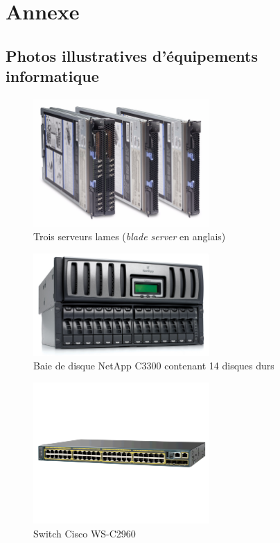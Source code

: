 \part{Annexe}

\chapter{Photos illustratives d'équipements informatique}

\begin{figure}[H]
	\centering
	\includegraphics[width=0.6\textwidth]{resource/img/blade}
	\caption{Trois serveurs lames (\emph{blade server} en anglais)}
\end{figure}

\begin{figure}[H]
	\centering
	\includegraphics[width=0.6\textwidth]{resource/img/netapp_c3300}
	\caption{Baie de disque NetApp C3300 contenant 14 disques durs}
	\label{netapp}
\end{figure}

\begin{figure}[H]
	\centering
	\includegraphics[width=0.6\textwidth]{resource/img/cisco-switch}
	\caption{Switch Cisco WS-C2960}
\end{figure}

